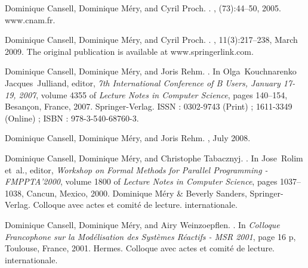 \documentclass[ 12pt]{article}
\begin{document}
\begin{thebibliography}{100}
Dominique Cansell, Dominique M{\'e}ry, and Cyril Proch.
.
, (73):44--50, 2005.
\newblock www.cnam.fr.

Dominique Cansell, Dominique M{\'e}ry, and Cyril Proch.
.
, 11(3):217--238, March 2009.
\newblock The original publication is available at www.springerlink.com.

Dominique Cansell, Dominique M{\'e}ry, and Joris Rehm.
.
\newblock In Olga~Kouchnarenko Jacques~Julliand, editor, {\em {7th
  International Conference of B Users, January 17-19, 2007}}, volume 4355 of
  {\em Lecture Notes in Computer Science}, pages 140--154, Besan{\c c}on,
  France, 2007. {Springer-Verlag}.
\newblock ISSN : 0302-9743 (Print) ; 1611-3349 (Online) ; ISBN :
  978-3-540-68760-3.

Dominique Cansell, Dominique M{\'e}ry, and Joris Rehm.
,
  July 2008.

Dominique Cansell, Dominique M{\'e}ry, and Christophe Tabacznyj.
.
\newblock In Jose~Rolim et~al., editor, {\em {Workshop on Formal Methods for
  Parallel Programming - FMPPTA'2000}}, volume 1800 of {\em Lecture Notes in
  Computer Science}, pages 1037--1038, Cancun, Mexico, 2000. {Dominique
  M{\'e}ry \& Beverly Sanders}, {Springer-Verlag}.
\newblock Colloque avec actes et comit{\'e} de lecture. internationale.

Dominique Cansell, Dominique M{\'e}ry, and Airy Weinzoepflen.
.
\newblock In {\em {Colloque Francophone sur la Mod{\'e}lisation des
  Syst{\`e}mes R{\'e}actifs - MSR 2001}}, page 16 p, Toulouse, France, 2001.
  {Hermes}.
\newblock Colloque avec actes et comit{\'e} de lecture. internationale.


\end{thebibliography}
\end{document}
